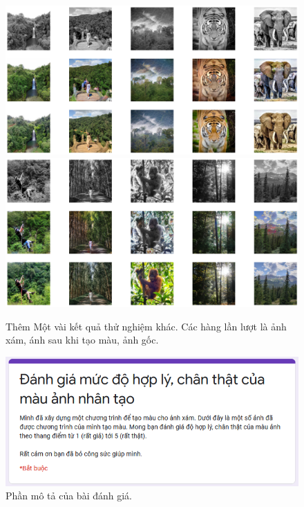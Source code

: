 \documentclass[a4paper, 12pt]{report}
\begin{document}
\begin{figure}[!h]
\captionsetup{width=0.8\textwidth}
\centering
\includegraphics[width=15cm]{images/demo3.png}
\includegraphics[width=15cm]{images/demo4.png}
\caption{Thêm Một vài kết quả thử nghiệm khác. Các hàng lần lượt là ảnh xám, ánh sau khi tạo màu, ảnh gốc.}
\label{fig:onemoreresults}
\end{figure}

\begin{figure}[!h]
\captionsetup{width=0.8\textwidth}
\centering
\includegraphics[width=14cm]{images/question.PNG}
\caption{Phần mô tả của bài đánh giá.}
\label{fig:dessurvey}
\end{figure}
\end{document}
